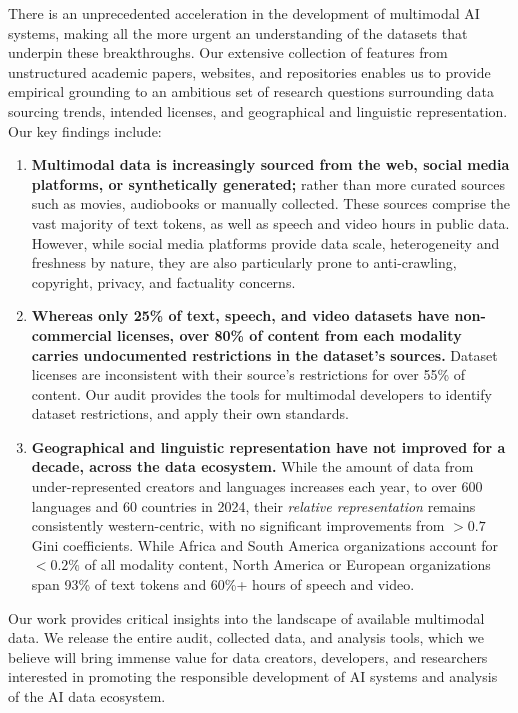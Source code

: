 There is an unprecedented acceleration in the development of multimodal AI systems, making all the more urgent an understanding of the datasets that underpin these breakthroughs. Our extensive collection of features from unstructured academic papers, websites, and repositories enables us to provide empirical grounding to an ambitious set of research questions surrounding data sourcing trends, intended licenses, and geographical and linguistic representation.
Our key findings include:
\begin{enumerate}[noitemsep]
    \item \textbf{Multimodal data is increasingly sourced from the web, social media platforms, or synthetically generated;} rather than more curated sources such as movies, audiobooks or manually collected. These sources comprise the vast majority of text tokens, as well as speech and video hours in public data. 
    However, while social media platforms provide data scale, heterogeneity and freshness by nature, they are also particularly prone to anti-crawling, copyright, privacy, and factuality concerns.
    
    \item \textbf{Whereas only 25\% of text, speech, and video datasets have non-commercial licenses, over 80\% of content from each modality carries undocumented restrictions in the dataset's sources.} Dataset licenses are inconsistent with their source's restrictions for over 55\% of content. 
    Our audit provides the tools for multimodal developers to identify dataset restrictions, and apply their own standards.
    \item \textbf{Geographical and linguistic representation have not improved for a decade, across the data ecosystem.} 
    While the amount of data from under-represented creators and languages increases each year, to over 600 languages and 60 countries in 2024, their \emph{relative representation} remains consistently western-centric, with no significant improvements from $>0.7$ Gini coefficients.
    While Africa and South America organizations account for $<0.2\%$ of all modality content, North America or European organizations span 93\% of text tokens and 60\%+ hours of speech and video. 
    
\end{enumerate}
Our work provides critical insights into the landscape of available multimodal data. We release the entire audit, collected data, and analysis tools, which we believe will bring immense value for data creators, developers, and researchers interested in promoting the responsible development of AI systems and analysis of the AI data ecosystem.
